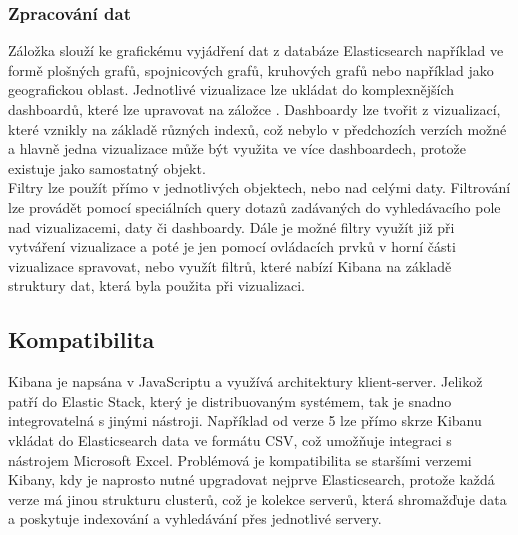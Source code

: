 \documentclass[czech,BP]{thesiskiv}
\begin{document}
 \subsubsection{Zpracování dat}
 Záložka  slouží ke grafickému vyjádření dat z databáze Elasticsearch například ve formě plošných grafů, spojnicových grafů, kruhových grafů nebo například jako geografickou oblast. Jednotlivé vizualizace lze ukládat do komplexnějších dashboardů, které lze upravovat na záložce . Dashboardy lze tvořit z vizualizací, které vznikly na základě různých indexů, což nebylo v předchozích verzích možné a hlavně jedna vizualizace může být využita ve více dashboardech, protože existuje jako samostatný objekt.
 \\
 Filtry lze použít přímo v jednotlivých objektech, nebo nad celými daty. Filtrování lze provádět pomocí speciálních query dotazů zadávaných do vyhledávacího pole nad vizualizacemi, daty či dashboardy. Dále je možné filtry využít již při vytváření vizualizace a poté je jen pomocí ovládacích prvků v horní části vizualizace spravovat, nebo využít filtrů, které nabízí Kibana na základě struktury dat, která byla použita při vizualizaci.\cite{KibanaQueries}
 
 \subsection{Kompatibilita}
	Kibana je napsána v JavaScriptu a využívá architektury klient-server. Jelikož patří do Elastic Stack, který je distribuovaným systémem, tak je snadno integrovatelná s jinými nástroji. Například od verze 5 lze přímo skrze Kibanu vkládat do Elasticsearch data ve formátu CSV, což umožňuje integraci s nástrojem Microsoft Excel. Problémová je kompatibilita se staršími verzemi Kibany, kdy je naprosto nutné upgradovat nejprve Elasticsearch, protože každá verze má jinou strukturu clusterů, což je kolekce serverů, která shromažďuje data a poskytuje indexování a vyhledávání přes jednotlivé servery.\cite{KibanaClusters}
 
\end{document}
